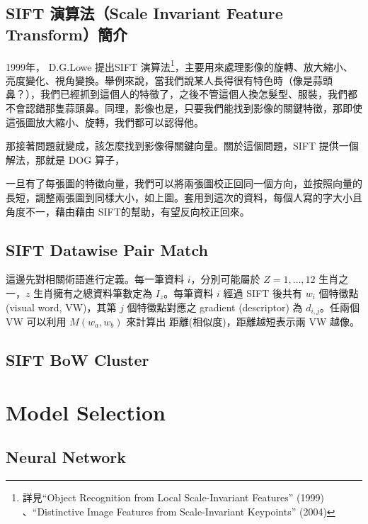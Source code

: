\subsection*{SIFT 演算法（Scale Invariant Feature Transform）簡介}
1999年， D.G.Lowe 提出SIFT 演算法\footnote{詳見``Object Recognition from Local Scale-Invariant Features'' (1999) 、``Distinctive Image Features from Scale-Invariant Keypoints'' (2004)}，主要用來處理影像的旋轉、放大縮小、亮度變化、視角變換。舉例來說，當我們說某人長得很有特色時（像是蒜頭鼻？），我們已經抓到這個人的特徵了，之後不管這個人換怎髮型、服裝，我們都不會認錯那隻蒜頭鼻。同理，影像也是，只要我們能找到影像的關鍵特徵，那即使這張圖放大縮小、旋轉，我們都可以認得他。

那接著問題就變成，該怎麼找到影像得關鍵向量。關於這個問題，SIFT 提供一個解法，那就是 DOG 算子，



一旦有了每張圖的特徵向量，我們可以將兩張圖校正回同一個方向，並按照向量的長短，調整兩張圖到同樣大小，如上圖。套用到這次的資料，每個人寫的字大小且角度不一，藉由藉由 SIFT的幫助，有望反向校正回來。



\subsection*{SIFT Datawise Pair Match}
這邊先對相關術語進行定義。每一筆資料 $i$，分別可能屬於 $Z=1,\ldots,12$ 生肖之一，$z$ 生肖擁有之總資料筆數定為 $I_z$。每筆資料 $i$ 經過 SIFT 後共有 $w_i$ 個特徵點 (visual word, VW)，其第 $j$ 個特徵點對應之 gradient (descriptor) 為 $d_{i, j}$。任兩個 VW 可以利用 $M(w_a, w_b)$ 來計算出 距離(相似度)，距離越短表示兩 VW 越像。

\subsection*{SIFT BoW Cluster}

\section{Model Selection}
\subsection*{Neural Network}

